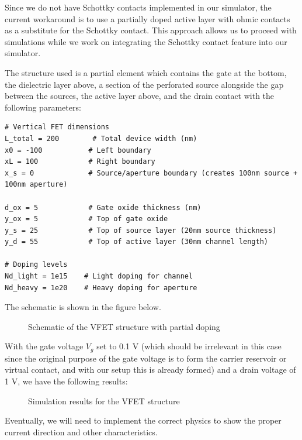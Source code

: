 \documentclass{article}
\begin{document}
Since we do not have Schottky contacts implemented in our simulator, the current workaround is to use a partially doped active layer with ohmic contacts as a substitute for the Schottky contact. This approach allows us to proceed with simulations while we work on integrating the Schottky contact feature into our simulator.

The structure used is a partial element which contains the gate at the bottom, the dielectric layer above, a section of the perforated source alongside the gap between the sources, the active layer above, and the drain contact with the following parameters:

\begin{verbatim}
# Vertical FET dimensions
L_total = 200        # Total device width (nm)
x0 = -100           # Left boundary
xL = 100            # Right boundary
x_s = 0             # Source/aperture boundary (creates 100nm source + 100nm aperture)

d_ox = 5            # Gate oxide thickness (nm)
y_ox = 5            # Top of gate oxide
y_s = 25            # Top of source layer (20nm source thickness)
y_d = 55            # Top of active layer (30nm channel length)

# Doping levels
Nd_light = 1e15    # Light doping for channel
Nd_heavy = 1e20    # Heavy doping for aperture
\end{verbatim}

The schematic is shown in the figure below.

\begin{figure}[H]
    \centering
    \caption{Schematic of the VFET structure with partial doping}
    \label{fig:vfet_schematic}
\end{figure}

With the gate voltage $V_g$ set to 0.1 V (which should be irrelevant in this case since the original purpose of the gate voltage is to form the carrier reservoir or virtual contact, and with our setup this is already formed) and a drain voltage of 1 V, we have the following results:

\begin{figure}[H]
    \centering
    \caption{Simulation results for the VFET structure}
    \label{fig:vfet_results}
\end{figure}

Eventually, we will need to implement the correct physics to show the proper current direction and other characteristics.
\end{document}
